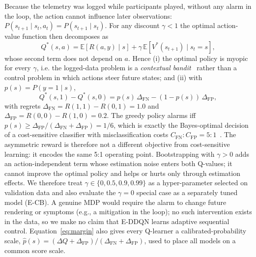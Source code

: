 Because the telemetry was logged while participants played, without any alarm in the loop, the action cannot influence later observations: $P(s_{t+1}\mid s_t,a_t)=P(s_{t+1}\mid s_t)$. For any discount $\gamma<1$ the optimal action-value function then decomposes as
\begin{equation}
Q^*(s,a)=\mathbb{E}[R(a,y)\mid s]+\gamma\,\mathbb{E}[V^*(s_{t+1})\mid s_t=s],
\label{eq:decomp}
\end{equation}
whose second term does not depend on $a$. Hence (i) the optimal policy is myopic for every $\gamma$, i.e. the logged-data problem is a \emph{contextual bandit}~\cite{lattimore2020bandit} rather than a control problem in which actions steer future states; and (ii) with $p(s)=P(y=1\mid s)$,
\begin{equation}
Q^*(s,1)-Q^*(s,0)=p(s)\,\Delta_{\mathrm{FN}}-(1-p(s))\,\Delta_{\mathrm{FP}},
\label{eq:margin}
\end{equation}
with regrets $\Delta_{\mathrm{FN}}=R(1,1)-R(0,1)=1.0$ and $\Delta_{\mathrm{FP}}=R(0,0)-R(1,0)=0.2$. The greedy policy alarms iff $p(s)\ge \Delta_{\mathrm{FP}}/(\Delta_{\mathrm{FN}}+\Delta_{\mathrm{FP}})=1/6$, which is exactly the Bayes-optimal decision of a cost-sensitive classifier with misclassification costs $C_{\mathrm{FN}}:C_{\mathrm{FP}}=5:1$~\cite{elkan2001cost}. The asymmetric reward is therefore not a different objective from cost-sensitive learning: it encodes the same 5:1 operating point. Bootstrapping with $\gamma>0$ adds an action-independent term whose estimation noise enters both Q-values; it cannot improve the optimal policy and helps or hurts only through estimation effects. We therefore treat $\gamma\in\{0,0.5,0.9,0.99\}$ as a hyper-parameter selected on validation data and also evaluate the $\gamma=0$ special case as a separately tuned model (E-CB). A genuine MDP would require the alarm to change future rendering or symptoms (e.g., a mitigation in the loop); no such intervention exists in the data, so we make no claim that E-DDQN learns adaptive sequential control. Equation~\eqref{eq:margin} also gives every Q-learner a calibrated-probability scale, $\hat p(s)=(\Delta Q+\Delta_{\mathrm{FP}})/(\Delta_{\mathrm{FN}}+\Delta_{\mathrm{FP}})$, used to place all models on a common score scale.

